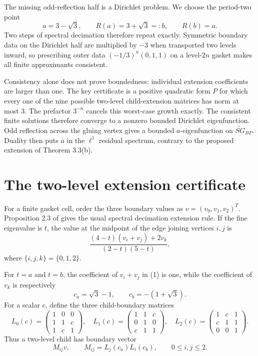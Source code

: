 \documentclass[11pt]{article}
\newcommand{\SG}{\widetilde{SG}}
\newcommand{\Rmap}{R}
\begin{document}
The missing odd-reflection half is a Dirichlet problem. We choose the
period-two point
\[
 a=3-\sqrt3,\qquad \Rmap(a)=3+\sqrt3=:b,\qquad \Rmap(b)=a.
\]
Two steps of spectral decimation therefore repeat exactly. Symmetric boundary
data on the Dirichlet half are multiplied by $-3$ when transported two levels
inward, so prescribing outer data $(-1/3)^n(0,1,1)$ on a level-$2n$ gasket
makes all finite approximants consistent.

Consistency alone does not prove boundedness: individual extension
coefficients are larger than one. The key certificate is a positive quadratic
form $P$ for which every one of the nine possible two-level child-extension
matrices has norm at most $3$. The prefactor $3^{-n}$ cancels this worst-case
growth exactly. The consistent finite solutions therefore converge to a
nonzero bounded Dirichlet eigenfunction. Odd reflection across the gluing
vertex gives a bounded $a$-eigenfunction on $\SG_{BP}$. Duality then puts $a$
in the $\ell^1$ residual spectrum, contrary to the proposed extension of
Theorem 3.3(b).

\section{The two-level extension certificate}

For a finite gasket cell, order the three boundary values as
$v=(v_0,v_1,v_2)^T$. Proposition 2.3 of \cite{CHQSZ} gives the usual spectral
decimation extension rule. If the fine eigenvalue is $t$, the value at the
midpoint of the edge joining vertices $i,j$ is
\[
 \frac{(4-t)(v_i+v_j)+2v_k}{(2-t)(5-t)},                     \tag{1}
\]
where $\{i,j,k\}=\{0,1,2\}$.

For $t=a$ and $t=b$, the coefficient of $v_i+v_j$ in (1) is one, while the
coefficient of $v_k$ is respectively
\[
 c_a=\sqrt3-1,\qquad c_b=-(1+\sqrt3).                        \tag{2}
\]
For a scalar $c$, define the three child-boundary matrices
\[
 L_0(c)=\begin{pmatrix}1&0&0\\1&1&c\\1&c&1\end{pmatrix},\quad
 L_1(c)=\begin{pmatrix}1&1&c\\0&1&0\\c&1&1\end{pmatrix},\quad
 L_2(c)=\begin{pmatrix}1&c&1\\c&1&1\\0&0&1\end{pmatrix}. \tag{3}
\]
Thus a two-level child has boundary vector
\[
 M_{ij}v,\qquad M_{ij}=L_j(c_a)L_i(c_b),\qquad 0\le i,j\le2. \tag{4}
\]
\end{document}
